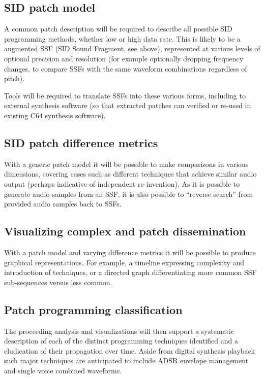 \documentclass[10pt]{article}
\begin{document}
\begin{multicols*}{2}
  \subsection{SID patch model}
  A common patch description will be required to describe all possible
  SID programming methods, whether low or high data rate. This is
  likely to be a augmented SSF (SID Sound Fragment, see above),
  represented at various levels of optional precision and resolution
  (for example optionally dropping frequency changes, to compare SSFs
  with the same waveform combinations regardless of pitch).

  Tools will be required to translate SSFs into these various forms,
  including to external synthesis software (so that extracted patches
  can verified or re-used in existing C64 synthesis software).

  \subsection{SID patch difference metrics}
  With a generic patch model it will be possible to make comparisons
  in various dimensions, covering cases such as different techniques
  that achieve similar audio output (perhaps indicative of
  independent re-invention). As it is possible to generate audio
  samples from an SSF, it is also possible to ``reverse search'' from
  provided audio samples back to SSFs.

  \subsection{Visualizing complex and patch dissemination}
  With a patch model and varying difference metrics it will be
  possible to produce graphical representations. For example, a
  timeline expressing complexity and introduction of techniques,
  or a directed graph differentiating more common SSF sub-sequences
  versus less common.

  \subsection{Patch programming classification}
  The proceeding analysis and visualizations will then support
  a systematic description of each of the distinct programming
  techniques identified and a eludication of their propagation
  over time. Aside from digital synthesis playback such major
  techniques are anticipated to include ADSR envelope
  management and single voice combined waveforms.


\end{multicols*}
\end{document}
